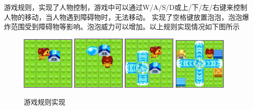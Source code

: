 \documentclass[UTF8, a4paper]{ctexart}
\begin{document}
游戏规则，实现了人物控制，游戏中可以通过W/A/S/D或上/下/左/右键来控制人物的移动，当人物遇到障碍物时，无法移动。
实现了空格键放置泡泡，泡泡爆炸范围受到障碍物等影响。泡泡威力可以增加。以上规则实现情况如下图所示
  \begin{figure}[h]
    \centering
        {\includegraphics[width=0.23\textwidth]{move.png}}
    \hspace{0.01\textwidth}
        {\includegraphics[width=0.23\textwidth]{plantbomb.png}}
    \hspace{0.01\textwidth}
        {\includegraphics[width=0.23\textwidth]{explode1.png}}
    \hspace{0.01\textwidth}
        {\includegraphics[width=0.23\textwidth]{power.png}}
    \caption{游戏规则实现}
    \label{fig:gameSetup}
  \end{figure}
\end{document}
